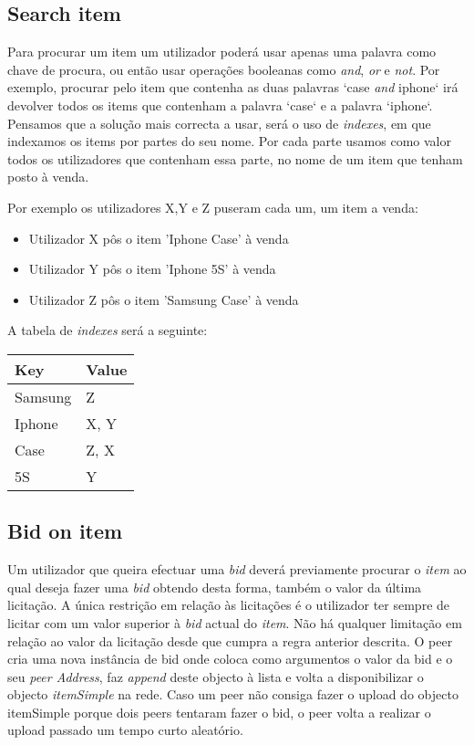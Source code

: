 \documentclass[paper=a4, fontsize=11pt]{scrartcl}
\numberwithin{equation}{section}    %
\numberwithin{figure}{section}      %
\numberwithin{table}{section}       %
\begin{document}
\subsection{Search item}
Para procurar um item um utilizador poderá usar apenas uma palavra como chave de procura, ou então usar operações booleanas como \textit{and}, \textit{or} e
\textit{not}. Por exemplo, procurar pelo item que contenha as duas palavras `case \textit{and}  iphone` irá devolver todos os items que contenham a palavra `case` e a palavra `iphone`. Pensamos que a solução mais correcta a usar, será o uso de \textit{indexes}, em que indexamos os items por partes do seu nome. Por cada parte usamos como valor todos os utilizadores que contenham essa parte, no nome de um item que tenham posto à venda. 

Por exemplo os utilizadores X,Y e Z puseram cada um, um item a venda:
\begin{itemize}
\item Utilizador X pôs o item 'Iphone Case' à venda
\item Utilizador Y pôs o item 'Iphone 5S' à venda
\item Utilizador Z pôs o item 'Samsung Case' à venda
\end{itemize}

A tabela de \textit{indexes} será a seguinte:
\begin{table}[h]
\centering
\begin{tabular}{|l|l|}
\hline
Key     & Value  \\ \hline
Samsung & Z      \\ \hline
Iphone  & X, Y \\ \hline
Case    & Z, X\\ \hline
5S    & Y \\ \hline
\end{tabular}
\end{table}

\subsection{Bid on item}
Um utilizador que queira efectuar uma \textit{bid} deverá previamente procurar o \textit{item} ao qual deseja fazer uma \textit{bid} obtendo desta forma, também o valor da última licitação. A única restrição em relação às licitações é o utilizador ter sempre de licitar com um valor superior à \textit{bid}
actual do \textit{item}. Não há qualquer limitação em relação ao valor da licitação desde que cumpra a regra anterior descrita. O peer cria uma nova instância de bid onde coloca como argumentos o valor da bid e o seu \textit{peer Address}, faz \textit{append} deste objecto à lista e volta a disponibilizar o objecto \textit{itemSimple} na rede. Caso um peer não consiga fazer o upload do objecto itemSimple porque dois peers tentaram fazer o bid, o peer volta a realizar o upload passado um tempo curto aleatório.
 
\end{document}
